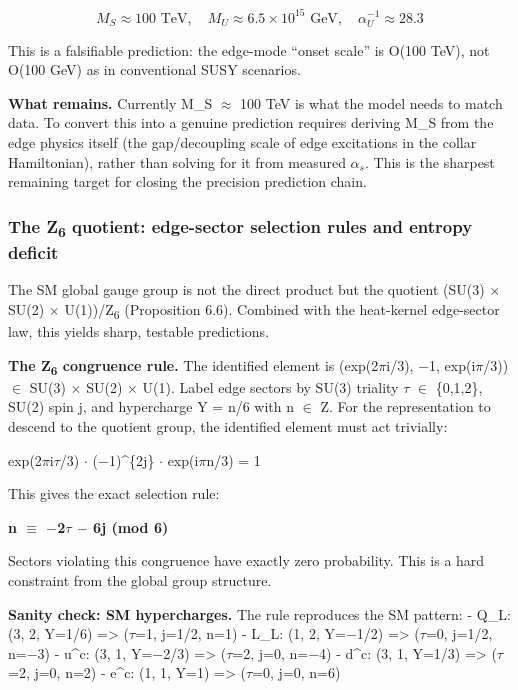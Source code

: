 \documentclass[11pt,a4paper]{article}
\theoremstyle{remark}
\begin{document}
\[
M_S \approx 100 \text{ TeV}, \quad M_U \approx 6.5 \times 10^{15} \text{ GeV}, \quad \alpha_U^{-1} \approx 28.3
\]

This is a falsifiable prediction: the edge-mode ``onset scale'' is O(100 TeV), not O(100 GeV) as in conventional SUSY scenarios.

\textbf{What remains.} Currently M\_S \ensuremath{\approx} 100 TeV is what the model needs to match data. To convert this into a genuine prediction requires deriving M\_S from the edge physics itself (the gap/decoupling scale of edge excitations in the collar Hamiltonian), rather than solving for it from measured \(\alpha_s\). This is the sharpest remaining target for closing the precision prediction chain.

\subsubsection{\texorpdfstring{The Z\textsubscript{6} quotient: edge-sector selection rules and entropy deficit}{The Z quotient: edge-sector selection rules and entropy deficit}}\label{the-z-quotient-edge-sector-selection-rules-and-entropy-deficit}

The SM global gauge group is not the direct product but the quotient
(SU(3) \ensuremath{\times} SU(2) \ensuremath{\times} U(1))/Z\textsubscript{6} (Proposition 6.6). Combined with
the heat-kernel edge-sector law, this yields sharp, testable predictions.

\textbf{The Z\textsubscript{6} congruence rule.} The identified element is (exp(2\ensuremath{\pi}i/3), \ensuremath{-}1, exp(i\ensuremath{\pi}/3)) \ensuremath{\in} SU(3) \ensuremath{\times} SU(2) \ensuremath{\times} U(1). Label edge sectors by SU(3) triality \ensuremath{\tau} \ensuremath{\in} \{0,1,2\}, SU(2) spin j, and hypercharge Y = n/6 with n \ensuremath{\in} Z. For the representation to descend to the quotient group, the identified element must act trivially:

exp(2\ensuremath{\pi}i\ensuremath{\tau}/3) \ensuremath{\cdot} (\ensuremath{-}1)\^{}\{2j\} \ensuremath{\cdot} exp(i\ensuremath{\pi}n/3) = 1

This gives the exact selection rule:

\textbf{n \ensuremath{\equiv} \ensuremath{-}2\ensuremath{\tau} \ensuremath{-} 6j (mod 6)}

Sectors violating this congruence have exactly zero probability. This is a
hard constraint from the global group structure.

\textbf{Sanity check: SM hypercharges.} The rule reproduces the SM pattern:
- Q\_L: (3, 2, Y=1/6) =\textgreater{} (\ensuremath{\tau}=1, j=1/2, n=1) \checkmark{}
- L\_L: (1, 2, Y=\ensuremath{-}1/2) =\textgreater{} (\ensuremath{\tau}=0, j=1/2, n=\ensuremath{-}3) \checkmark{}
- u\^{}c: (3, 1, Y=\ensuremath{-}2/3) =\textgreater{} (\ensuremath{\tau}=2, j=0, n=\ensuremath{-}4) \checkmark{}
- d\^{}c: (3, 1, Y=1/3) =\textgreater{} (\ensuremath{\tau}=2, j=0, n=2) \checkmark{}
- e\^{}c: (1, 1, Y=1) =\textgreater{} (\ensuremath{\tau}=0, j=0, n=6) \checkmark{}
\end{document}
